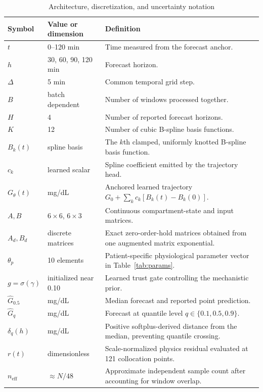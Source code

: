 \documentclass[journal]{IEEEtran}
\begin{document}
\begin{table}[t]
\centering
\caption{Architecture, discretization, and uncertainty notation}
\label{tab:arch}
\footnotesize
\begin{tabular}{lll}
\toprule
Symbol & Value or dimension & Definition \\
\midrule
$t$ & 0--120 min & Time measured from the forecast anchor. \\
$h$ & 30, 60, 90, 120 min & Forecast horizon. \\
$\Delta$ & 5 min & Common temporal grid step. \\
$B$ & batch dependent & Number of windows processed together. \\
$H$ & 4 & Number of reported forecast horizons. \\
$K$ & 12 & Number of cubic B-spline basis functions. \\
$B_k(t)$ & spline basis & The $k$th clamped, uniformly knotted B-spline basis function. \\
$c_k$ & learned scalar & Spline coefficient emitted by the trajectory head. \\
$G_\theta(t)$ & mg/dL & Anchored learned trajectory $G_0 + \sum_k c_k[B_k(t) - B_k(0)]$. \\
$A, B$ & $6\times6$, $6\times3$ & Continuous compartment-state and input matrices. \\
$A_d, B_d$ & discrete matrices & Exact zero-order-hold matrices obtained from one augmented matrix exponential. \\
$\theta_p$ & 10 elements & Patient-specific physiological parameter vector in Table~\ref{tab:params}. \\
$g = \sigma(\gamma)$ & initialized near 0.10 & Learned trust gate controlling the mechanistic prior. \\
$\hat{G}_{0.5}$ & mg/dL & Median forecast and reported point prediction. \\
$\hat{G}_q$ & mg/dL & Forecast at quantile level $q \in \{0.1, 0.5, 0.9\}$. \\
$\delta_q(h)$ & mg/dL & Positive softplus-derived distance from the median, preventing quantile crossing. \\
$r(t)$ & dimensionless & Scale-normalized physics residual evaluated at 121 collocation points. \\
$n_{\text{eff}}$ & $\approx N/48$ & Approximate independent sample count after accounting for window overlap. \\
\bottomrule
\end{tabular}
\end{table}
\end{document}
